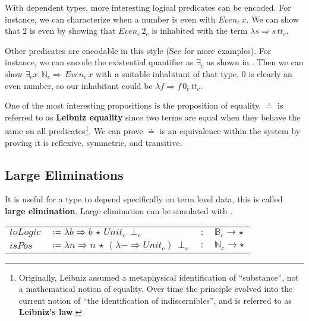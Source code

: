 With dependent types, more interesting logical predicates can be encoded.
For instance, we can characterize when a number is even with $Even_{c}\,x$.
We can show that $2$ is even by showing that $Even_{c}\,2_{c}$ is inhabited with the term $\lambda s\Rightarrow s\,tt_{c}$.

Other predicates are encodable in this style (See \cite{Martin-Lof-1971,cardelli1986polymorphic,10.1016/0890-5401(88)90005-3} for more examples).
For instance, we can encode the existential quantifier as $\exists_{c}$ as shown in .
Then we can show $\exists_{c}x:\mathbb{N}_{c}\Rightarrow\,Even_{c}\,x$ with a suitable inhabitant of that type.
$0$ is clearly an even number, so our inhabitant could be $\lambda f\Rightarrow f\,0_{c}\,tt_{c}$.

One of the most interesting propositions is the proposition of equality.
$\doteq$ is referred to as \textbf{Leibniz equality} since two terms are equal when they behave the same on all predicates\footnote{
  Originally, Leibniz assumed a metaphysical identification of ``substance'', not a mathematical notion of equality\cite[Section 9]{Leibniz1686}.
  Over time the principle evolved into the current notion of ``the identification of indiscernibles'', and is referred to as \textbf{Leibniz's law}.}.
We can prove $\doteq$ is an equivalence within the system by proving it is reflexive, symmetric, and transitive.

\subsection{Large Eliminations}


It is useful for a type to depend specifically on term level data, this is called \textbf{large elimination}.
Large elimination can be simulated with \tit{}.

\begin{tabular}{llll}
  $toLogic$ & $\coloneqq\lambda b\Rightarrow b\,\star\,Unit_{c}\,\perp_{c}$ & $:$ & $\mathbb{B}_{c}\rightarrow\star$\tabularnewline
  $isPos$ & $\coloneqq\lambda n\Rightarrow n\,\star\,(\lambda-\Rightarrow Unit_{c})\,\perp_{c}$ & $:$ & $\mathbb{N}_{c}\rightarrow\star$\tabularnewline
\end{tabular}
  
